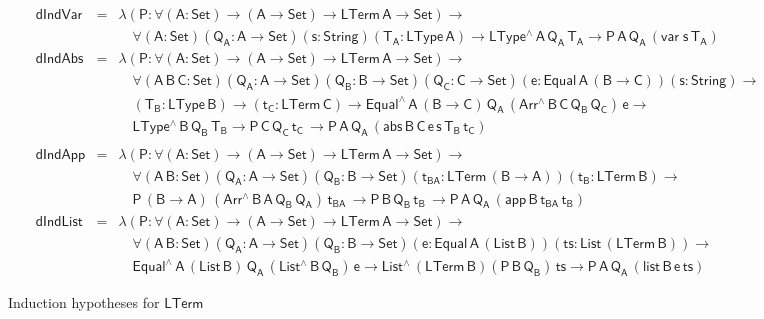 \documentclass[sigplan,10pt,anonymous,review]{acmart}
\begin{document}
\begin{figure*}[t]

\begin{adjustbox}{varwidth=7.3in, max width=7.1in, margin=-0.0in 0in
      -0.2in 0in, fbox, center} 

{\small
\[\begin{array}{lll}
\mathsf{dIndVar} & = & \mathsf{\lambda (P : \forall (A : Set) \to (A \to Set) \to
  LTerm\,A  \to Set) \to}\\
& &   \quad\mathsf{\forall (A : Set) (Q_A : A \to Set) (s : String) (T_A :
  LType\, A) \to LType^{\wedge} \, A\, Q_A\, T_A \to P \, A\, Q_A\,
 (var \; s\, T_A)}\\[1ex]
\mathsf{dIndAbs} & = & \mathsf{\lambda (P : \forall (A : Set) \to (A \to Set) \to
  LTerm\,A \to Set) \to} \\ 
& &   \quad\mathsf{
  \forall (A\,B\,C: Set) (Q_A : A \to Set)  (Q_B : B \to Set) (Q_C : C
  \to Set) (e : Equal\, A\, (B \to C)) (s : String) \to } \\ 
& &   \quad\mathsf{(T_B : LType\, B) \to (t_C : LTerm\, C)
  \to Equal^{\wedge}\,A\,(B \to C)\, Q_A \, (Arr^{\wedge} \, B\, C\,
  Q_B \, Q_C) \, e \to  } \\
& &   \quad\mathsf{
  LType^{\wedge}\, B\, Q_B\, T_B
  \to P\, C\, Q_C\, t_C\, 
  \to P \, A\, Q_A\, (abs \,B \,C \, e \,s \,T_B \, t_C)}\\
 \\
\mathsf{dIndApp} & = &  \mathsf{\lambda (P : \forall (A : Set) \to (A \to Set) \to LTerm\,A
    \to Set)\to} \\ 
& &  \quad \mathsf{
  \forall (A \,B : Set) (Q_A : A \to Set)  (Q_B : B \to Set) 
   (t_{BA} : LTerm\, (B \to A)) (t_B : LTerm\, B) \to} \\
& &   \quad \mathsf{
  P\, (B \to A)\, (Arr^{\wedge} \, B\, A\, Q_B \, Q_A) \, t_{BA} \, 
  \to P\, B\, Q_B\, t_B\, 
  \to P \, A\, Q_A\, (app \,B \,t_{BA} \, t_B) }\\[1ex]
\mathsf{dIndList} & = &   \mathsf{\lambda (P : \forall (A : Set) \to (A \to Set) \to LTerm\,A
    \to Set) \to} \\ 
& &   \quad \mathsf{
  \forall (A \,B : Set) (Q_A : A \to Set)  (Q_B : B \to Set) 
    (e : Equal\, A\, (List\, B)) (ts : List\, (LTerm\, B)) \to} \\ 
& &   \quad \mathsf{
    Equal^{\wedge}\, A\, (List\,B)\, Q_A\, (List^{\wedge}\, B\, Q_B)\, e 
  \to List^{\wedge}\, (LTerm\,B) (P\, B\, Q_B)\, ts
  \to P \, A\, Q_A\, (list \,B \,e \, ts) }
\end{array}\]}

\vspace*{-0.1in}

\caption{Induction hypotheses for $\mathsf{LTerm}$}\label{fig:ind-hyps-lterm}
\end{adjustbox}
\end{figure*}
\end{document}
